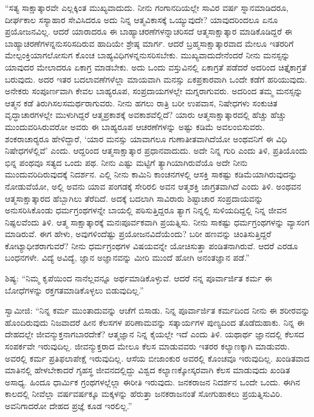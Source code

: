  “ಸತ್ಯ ಸಾಕ್ಷಾತ್ಕಾರವೇ ಎಲ್ಲಕ್ಕಿಂತ ಮುಖ್ಯವಾದುದು. ನೀನು ಗಂಗಾನದಿಯಲ್ಲೇ ಸಾವಿರ ವರ್ಷ ಸ್ನಾನಮಾಡಿದರೂ, ದೀರ್ಘಕಾಲ ಸಸ್ಯಾಹಾರ ಸೇವಿಸಿದರೂ ಅದು ನಿನ್ನ ಆತ್ಮವಿಕಾಸಕ್ಕೆ ಒಯ್ಯುವುದೇ? ಯಾವುದರಿಂದಲೂ ಏನೂ ಪ್ರಯೋಜನವಿಲ್ಲ. ಆದರೆ ಯಾರಾದರೂ ಈ ಬಾಹ್ಯಾಚರಣೆಗಳನ್ನಾಚರಿಸದೆ ಆತ್ಮಸಾಕ್ಷಾತ್ಕಾರ ಮಾಡಿಕೊಡಿದ್ದರೆ ಈ ಬಾಹ್ಯಾಚರಣೆಗಳನ್ನನುಸರಿಸದಿರುವ ಹಾದಿಯೇ ಶ್ರೇಷ್ಠ ಮಾರ್ಗ. ಆದರೆ ಬ್ರಹ್ಮಸಾಕ್ಷಾತ್ಕಾರವಾದ ಮೇಲೂ ಇತರರಿಗೆ ಮೇಲ್ಪಂಕ್ತಿಯಾಗಲೋಸುಗ ಕೊಂಚ ಬಾಹ್ಯವಿಧಿಗಳನ್ನನುಸರಿಸಬೇಕು. ಮುಖ್ಯವಾದುದೇನೆಂದರೆ ನೀನು ಮನಸ್ಸನ್ನು ಯಾವುದರ ಮೇಲಾದರೂ ಏಕಾಗ್ರ ಮಾಡಬೇಕು. ಅದು ಒಂದು ವಸ್ತುವಿನಲ್ಲಿ ಏಕಾಗ್ರತೆ ಪಡೆದರೆ ಅದರಿಂದ ಚಿತ್ತೈಕಾಗ್ರತೆ ಬರುವುದು. ಅದರ ಇತರ ಬದಲಾವಣೆಗಳೆಲ್ಲಾ ಮಾಯವಾಗಿ ಮನಸ್ಸು ಏಕಪ್ರಕಾರವಾಗಿ ಒಂದೇ ಕಡೆಗೆ ಹರಿಯುವುದು. ಅನೇಕರು ಸಂಪೂರ್ಣವಾಗಿ ಕೇವಲ ಬಾಹ್ಯರೂಪ, ಸಂಪ್ರದಾಯಗಳಲ್ಲೇ ಮಗ್ನರಾಗುವರು. ಅದರಿಂದ ತಮ್ಮ ಮನಸ್ಸನ್ನು ಆತ್ಮನ ಕಡೆ ತಿರುಗಿಸಲಸಮರ್ಥರಾಗುವರು. ನೀನು ಹಗಲು ರಾತ್ರಿ ಬರೀ ಉಪವಾಸ, ನಿಷೇಧಗಳು ಸಂಕುಚಿತ ವೃದ್ಧಾಚಾರಗಳಲ್ಲೇ ಮುಳುಗಿದ್ದರೆ ಆತ್ಮಪ್ರಕಾಶಕ್ಕೆ ಅವಕಾಶವೆಲ್ಲಿದೆ? ಯಾರು ಆತ್ಮಸಾಕ್ಷಾತ್ಕಾರದಲ್ಲಿ ಹೆಚ್ಚು ಹೆಚ್ಚು ಮುಂದುವರಿಸಿರುವರೋ ಅವರು ಈ ಬಾಹ್ಯರೂಪ ಆಚರಣೆಗಳನ್ನು ಅಷ್ಟು ಕಡಿಮೆ ಅವಲಂಬಿಸುವರು. ಶಂಕರಾಚಾರ‍್ಯರೂ‌ ಹೇಳಿದ್ದಾರೆ, ‘ಯಾರ ಮನಸ್ಸು ಯಾವಾಗಲೂ ಗುಣಾತೀತವಾಗಿದೆಯೋ ಅಂಥವನಿಗೆ ಈ ವಿಧಿ ನಿಷೇಧಗಳೆಲ್ಲಿವೆ’ ಎಂದು. ಆದ್ದರಿಂದ ಆತ್ಮಸಾಕ್ಷಾತ್ಕಾರ ಪ್ರಧಾನವಾದುದು. ಅದೇ ನಿನ್ನ ಗುರಿ ಎಂದು ತಿಳಿ, ಪ್ರತಿಯೊಂದು ಭಿನ್ನ ಪಂಥವೂ ಸತ್ಯದ ಒಂದು ಪಥ. ನೀನು ಎಷ್ಟು ಮಟ್ಟಿಗೆ ತ್ಯಾಗಿಯಾಗಿರುವೆಯೊ ಅದೇ ನೀನು ಮುಂದುವರಿದಿರುವುದಕ್ಕೆ ನಿದರ್ಶನ. ಎಲ್ಲಿ ನೀನು ಕಾಮಿನಿ ಕಾಂಚನಗಳಲ್ಲಿ ಆಸಕ್ತಿ ಸಾಕಷ್ಟು ಕಡಿಮೆಯಾಗಿರುವುದನ್ನು ನೋಡುವೆಯೋ, ಅಲ್ಲಿ ಅವನು ಯಾವ ಪಂಗಡಕ್ಕೆ ಸೇರಿರಲಿ ಅವನ ಆತ್ಮಶಕ್ತಿ ಜಾಗ್ರತವಾಗಿದೆ ಎಂದು ತಿಳಿ. ಅಂಥವನ ಆತ್ಮಸಾಕ್ಷಾತ್ಕಾರದ ಹೆಬ್ಬಾಗಿಲು ತೆರೆದಿದೆ. ಅದಕ್ಕೆ ಬದಲಾಗಿ ಸಾವಿರಾರು ಶಿಷ್ಟಾಚಾರ ಸಂಪ್ರದಾಯವನ್ನು ಅನುಸರಿಸಿಕೊಂಡು ಧರ್ಮಗ್ರಂಥಗಳನ್ನೇ ಬಾಯಲ್ಲಿ ಪಠಿಸುತ್ತಿದ್ದರೂ ತ್ಯಾಗ ನಿನ್ನಲ್ಲಿ ಸುಳಿಯದಿದ್ದಲ್ಲಿ ನಿನ್ನ ಜೀವನ ನಿಷ್ಫಲವೆಂದು ತಿಳಿ. ಆತ್ಮ ಸಾಕ್ಷಾತ್ಕಾರಕ್ಕೆ ಮನಃಪೂರ್ವಕವಾಗಿ ಪ್ರಯತ್ನಿಸು. ನೀನು ಸಾಕಷ್ಟು ಧರ್ಮಗ್ರಂಥಗಳನ್ನು ವ್ಯಾಸಂಗ ಮಾಡಿರುವೆ. ಈಗ ಹೇಳು, ಅವುಗಳಿಂದೆಷ್ಟು ಪ್ರಯೋಜನವಿದೆಯೆಂದು? ಬರೀ ಹಣವನ್ನು ಚಿಂತಿಸುತ್ತಿದ್ದರೆ ಕೋಟ್ಯಾಧೀಶರಾಗುವರೆ? ನೀನು ಧರ್ಮಗ್ರಂಥಗಳ ವಿಷಯವನ್ನೇ ಯೋಚಿಸುತ್ತಾ ಪಂಡಿತನಾಗಿರುವೆ. ಆದರೆ ಎರಡೂ ಬಂಧನಗಳೇ. ವಿದ್ಯೆ ಅವಿದ್ಯೆ, ಜ್ಞಾನ ಅಜ್ಞಾನವನ್ನು ಮೀರಿ ಮುಂದೆ ಹೋಗಿ ಅನಂತಜ್ಞಾನ ಪಡೆ.” 

 ಶಿಷ್ಯ: “ನಿಮ್ಮ ಕೃಪೆಯಿಂದ ನಾನೆಲ್ಲವನ್ನೂ ಅರ್ಥಮಾಡಿಕೊಳ್ಳುವೆ. ಆದರೆ ನನ್ನ ಪೂರ್ವಾರ್ಜಿತ ಕರ್ಮ ಈ ಬೋಧೆಗಳನ್ನು ರಕ್ತಗತಮಾಡಿಕೊಳ್ಳಲು ಬಿಡುವುದಿಲ್ಲ.” 

 ಸ್ವಾಮೀಜಿ: “ನಿನ್ನ ಕರ್ಮ ಮುಂತಾದುವನ್ನು ಆಚೆಗೆ ಬಿಸಾಡು. ನಿನ್ನ ಪೂರ್ವಾರ್ಜಿತ ಕರ್ಮದಿಂದ ನೀನು ಈ ಶರೀರವನ್ನು ಹೊಂದಿರುವುದು ನಿಜವಾದರೆ ಹೀನ ಕೆಲಸಗಳ ಪರಿಣಾಮವನ್ನು ಸತ್ಕಾರ್ಯಗಳ ಪುಣ್ಯದಿಂದ ತೊಡೆದುಹಾಕು. ನಿನ್ನ ಈ ದೇಹದಲ್ಲೇ ಜೀವನ್ಮುಕ್ತನಾಗಬಾರದೇಕೆ? ಆತ್ಮಜ್ಞಾನ ನಿನ್ನ ಕೈಯಲ್ಲೇ ಇದೆ ಎಂದು ತಿಳಿ. ಯಥಾರ್ಥ ಜ್ಞಾನದಲ್ಲಿ ಕೆಲಸದ ಸಂಪರ್ಕವೇ ಇರುವುದಿಲ್ಲ. ಜೀವನ್ಮುಕ್ತರಾದ ಮೇಲೂ ಕೆಲಸ ಮಾಡುವವರು ಇತರರ ಕಲ್ಯಾಣಕ್ಕಾಗಿ ಮಾಡುವರು. ಅವರಲ್ಲಿ ಕರ್ಮ ಪ್ರತಿಫಲಾಪೇಕ್ಷೆ ಇರುವುದಿಲ್ಲ. ಆಸೆಯ ಬೀಜಾಂಕುರ ಅವರಲ್ಲಿ ಕೊಂಚವೂ ಇರುವುದಿಲ್ಲ. ಖಂಡಿತವಾದ ಮಾತಿನಲ್ಲಿ ಹೇಳಬೇಕಾದರೆ ಗೃಹಸ್ಥ ಜೀವನದಲ್ಲಿದ್ದು ವಿಶ್ವದ ಕಲ್ಯಾಣಕ್ಕೋಸ್ಕರವಾಗಿ ಕೆಲಸ ಮಾಡುವುದು ಖಂಡಿತ ಅಸಾಧ್ಯ. ಹಿಂದೂ ಧಾರ್ಮಿಕ ಗ್ರಂಥಗಳಲ್ಲೆಲ್ಲಾ ಈ‌ರೀತಿ ಇರುವುದು. ಜನಕರಾಜನ ನಿದರ್ಶನ ಒಂದೇ ಒಂದು. ಈಗಿನ ಕಾಲದಲ್ಲಿ ನೀವೆಲ್ಲಾ ವರ್ಷವರ್ಷಕ್ಕೂ ಮಕ್ಕಳನ್ನು ಹೆರುತ್ತಾ ಜನಕರಾಜನಂತೆ ಸೋಗುಹಾಕಲು ಪ್ರಯತ್ನಿಸುವಿರಿ. ಅವನಿಗಾದರೋ ದೇಹದ ಪ್ರಜ್ಞೆ ಕೂಡ ಇರಲಿಲ್ಲ.” 

